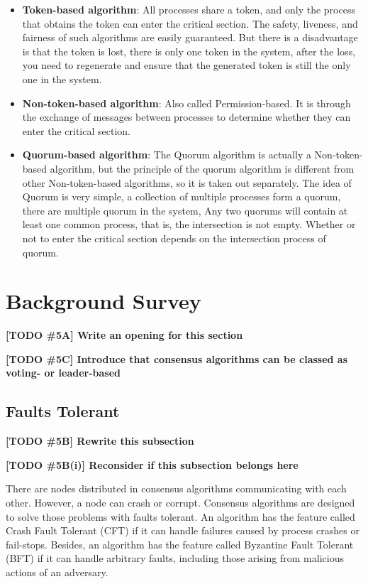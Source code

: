 \documentclass[12pt, a4paper]{article}
\newcommand{\todo}[2]{\textbf{\color{blue}[TODO \##1] #2}\par}
\begin{document}
\begin{itemize}
  \item \textbf{Token-based algorithm}: All processes share a token, and only the process that obtains the token can enter the critical section. The safety, liveness, and fairness of such algorithms are easily guaranteed. But there is a disadvantage is that the token is lost, there is only one token in the system, after the loss, you need to regenerate and ensure that the generated token is still the only one in the system.
  \item \textbf{Non-token-based algorithm}: Also called Permission-based. It is through the exchange of messages between processes to determine whether they can enter the critical section.
  \item \textbf{Quorum-based algorithm}: The Quorum algorithm is actually a Non-token-based algorithm, but the principle of the quorum algorithm is different from other Non-token-based algorithms, so it is taken out separately. The idea of Quorum is very simple, a collection of multiple processes form a quorum, there are multiple quorum in the system, Any two quorums will contain at least one common process, that is, the intersection is not empty. Whether or not to enter the critical section depends on the intersection process of quorum.
\end{itemize}


\section{Background Survey}

\todo{5A}{Write an opening for this section}
\todo{5C}{Introduce that consensus algorithms can be classed as voting- or leader-based}

\subsection{Faults Tolerant}
\todo{5B}{Rewrite this subsection}
\todo{5B(i)}{Reconsider if this subsection belongs here}
There are nodes distributed in consensus algorithms communicating with each other. However, a node can crash or corrupt. Consensus algorithms are designed to solve those problems with faults tolerant. An algorithm has the feature called Crash Fault Tolerant (CFT) if it can handle failures caused by process crashes or fail-stops. Besides, an algorithm has the feature called Byzantine Fault Tolerant (BFT) if it can handle arbitrary faults, including those arising from malicious actions of an adversary.
\end{document}
